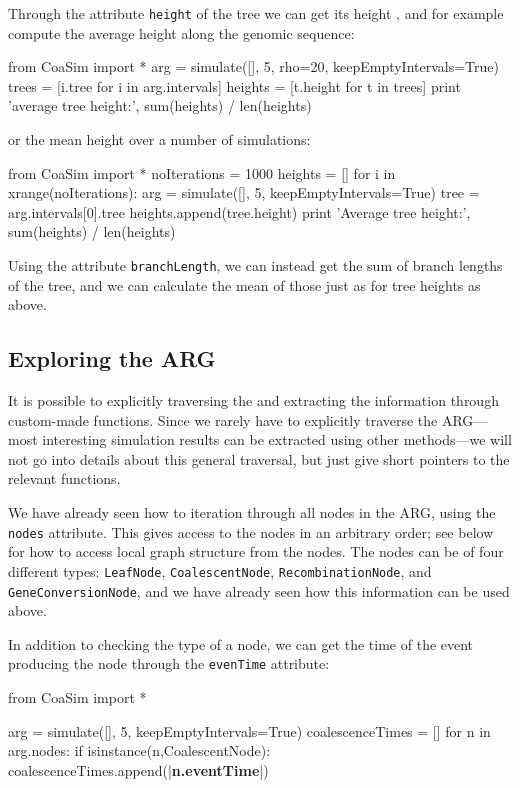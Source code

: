 \documentclass{manual}
\begin{document}
\begin{empfile}
Through the attribute \texttt{height} of the tree we can get its
height , and for example compute the average height along the genomic
sequence:
\begin{code}
from CoaSim import *
arg = simulate([], 5, rho=20, keepEmptyIntervals=True)
trees = [i.tree for i in arg.intervals]
heights = [t.height for t in trees]
print 'average tree height:', sum(heights) / len(heights)
\end{code}
or the mean height over a number of simulations:
\begin{code}
from CoaSim import *
noIterations = 1000
heights = []
for i in xrange(noIterations):
    arg = simulate([], 5, keepEmptyIntervals=True)
    tree = arg.intervals[0].tree
    heights.append(tree.height)
print 'Average tree height:', sum(heights) / len(heights)
\end{code}

\noindent
Using the attribute \texttt{branchLength}, we can instead get the sum
of branch lengths of the tree, and we can calculate the mean of those
just as for tree heights as above.


\subsection{Exploring the ARG}
\label{sec:exploring-arg}

It is possible to explicitly traversing the and extracting the
information through custom-made functions.  Since we rarely have to
explicitly traverse the ARG---most interesting simulation results can
be extracted using other methods---we will not go into details about
this general traversal, but just give short pointers to the relevant
functions.

We have already seen how to iteration through all nodes in the ARG,
using the \texttt{nodes} attribute.  This gives access to the nodes in
an arbitrary order; see below for how to access local graph structure
from the nodes.  The nodes can be of four different types:
\texttt{LeafNode}, \texttt{CoalescentNode},
\texttt{RecombinationNode}, and \texttt{GeneConversionNode}, and we
have already seen how this information can be used above.

In addition to checking the type of a node, we can get the time of the
event producing the node through the \texttt{evenTime} attribute:
\begin{ncode}
from CoaSim import *

arg = simulate([], 5, keepEmptyIntervals=True)
coalescenceTimes = []
for n in arg.nodes:
    if isinstance(n,CoalescentNode):
        coalescenceTimes.append(|\textbf{n.eventTime}|)


\end{ncode}
\end{empfile}
\end{document}
